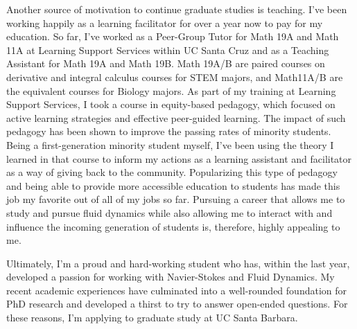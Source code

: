 \documentclass{article}
\begin{document}
Another source of motivation to continue graduate studies is teaching. I've been working happily as a learning facilitator for over a year now to pay for my education. So far, I've worked as a Peer-Group Tutor for Math 19A and Math 11A at Learning Support Services within UC Santa Cruz and as a Teaching Assistant for Math 19A and Math 19B. Math 19A/B are paired courses on derivative and integral calculus courses for STEM majors, and Math11A/B are the equivalent courses for Biology majors. As part of my training at Learning Support Services, I took a course in equity-based pedagogy, which focused on active learning strategies and effective peer-guided learning. The impact of such pedagogy has been shown to improve the passing rates of minority students. Being a first-generation minority student myself, I've been using the theory I learned in that course to inform my actions as a learning assistant and facilitator as a way of giving back to the community. Popularizing this type of pedagogy and being able to provide more accessible education to students has made this job my favorite out of all of my jobs so far. Pursuing a career that allows me to study and pursue fluid dynamics while also allowing me to interact with and influence the incoming generation of students is, therefore, highly appealing to me. 

Ultimately, I'm a proud and hard-working student who has, within the last year, developed a passion for working with Navier-Stokes and Fluid Dynamics. My recent academic experiences have culminated into a well-rounded foundation for PhD research and developed a thirst to try to answer open-ended questions. For these reasons, I'm applying to graduate study at UC Santa Barbara. 

\end{document}
